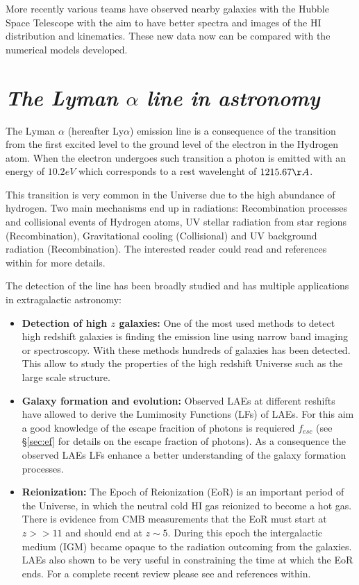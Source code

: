 More recently various teams \citep{Mas-Hesse09,LARS} have
observed nearby galaxies with the Hubble Space Telescope with the
aim to have better spectra and images of the HI distribution 
and kinematics. These new data now can be compared with the numerical 
models developed.

 

\section{\emph{The Lyman $\alpha$ line in astronomy}}\label{sec:lyuses}

The Lyman $\alpha$ (hereafter Ly$\alpha$) emission line is a consequence of the 
transition 
from the first excited level to the ground level of the electron
in the Hydrogen atom. When the electron undergoes such transition 
a photon is emitted with an energy of $10.2eV$ which corresponds to 
a rest wavelenght of $1215.67 \AA$. 

This transition is very common in the Universe due to the high abundance
of hydrogen. Two main mechanisms end up in \ly radiations: Recombination 
processes and collisional events of Hydrogen atoms, UV stellar radiation
from star regions (Recombination), Gravitational 
cooling (Collisional) and UV background radiation (Recombination). The interested
reader could read \citep{LaursenPhD} and references within for
more details. 

The detection of the \ly line has been broadly studied and has multiple 
applications in extragalactic astronomy:

\begin{itemize}
\item {\bf{Detection of high $z$ galaxies:}} One of the most used 
methods to detect high redshift galaxies is finding the \ly emission 
line using narrow band imaging or spectroscopy. With these methods 
hundreds of galaxies has been detected. This 
allow to study the properties of the high redshift Universe such as
the large scale structure. 
 
\item {\bf{Galaxy formation and evolution:}} Observed LAEs at different
reshifts have allowed to derive the Lumimosity Functions (LFs) of LAEs. 
For this aim a good knowledge of the escape fracition of 
photons is requiered $f_{esc}$ (see \S \ref{sec:ef} for details on the escape 
fraction of \ly photons). As a consequence the observed LAEs LFs enhance a
better understanding of the galaxy formation processes. 

\item {\bf{Reionization:}} The Epoch of Reionization (EoR) is an important
period of the Universe, in which the neutral cold HI gas reionized to 
become a hot gas. There is evidence from CMB measurements that 
the EoR must start at $z >> 11$ and should end at $z\sim5$. During this 
epoch the intergalactic medium (IGM) became opaque to the \ly radiation 
outcoming from the galaxies. LAEs also shown to be 
very useful in constraining the time at which the EoR ends. 
For a complete recent review please see \citep{review} and references
within.
 
\end{itemize}


